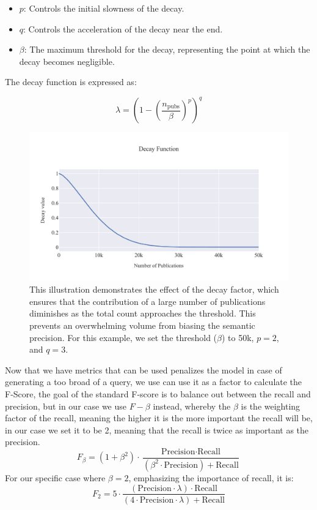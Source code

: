 \begin{itemize}
	\item \( p \): Controls the initial slowness of the decay.
	\item \( q \): Controls the acceleration of the decay near the end.
	\item $\beta$: The maximum threshold for the decay, representing the point at which the decay becomes negligible.
\end{itemize}

The decay function is expressed as:

\[
\lambda = \left(1 - \left(\frac{n_{\text{pubs}}}{\beta}\right)^p\right)^q
\]


\begin{figure}[h!]
	\centering	
	\includegraphics[scale=0.7]{pics/decay_function.pdf}
	\caption[Decay function for semantic precision]{This illustration demonstrates the effect of the decay factor, which ensures that the contribution of a large number of publications diminishes as the total count approaches the threshold. This prevents an overwhelming volume from biasing the semantic precision. For this example, we set the threshold (\( \beta \)) to 50k, \( p=2 \), and \( q=3 \).}	
	\label{fig:decay-function}
\end{figure}


Now that we have metrics that can be used penalizes the model in case of generating a too broad of a query, we use can use it as a factor to calculate the F-Score, the goal of the standard F-score is to balance out between the recall and precision, but in our case we use $F-\beta$ instead, whereby the $\beta$ is the weighting factor of the recall, meaning the higher it is the more important the recall will be, in our case we set it to be 2, meaning that the recall is twice as important as the precision.
\begin{equation}\label{eq:f-beta}
F_\beta = (1 + \beta^2) \cdot \frac{\text{Precision} \cdot \text{Recall}}{(\beta^2 \cdot \text{Precision}) + \text{Recall}}
\end{equation}
For our specific case where $\beta = 2$, emphasizing the importance of recall, it is:
\[
	F_2 = 5 \cdot \frac{(\text{Precision} \cdot \lambda) \cdot \text{Recall}}{(4 \cdot \text{Precision}\cdot \lambda) + \text{Recall}}
\]

